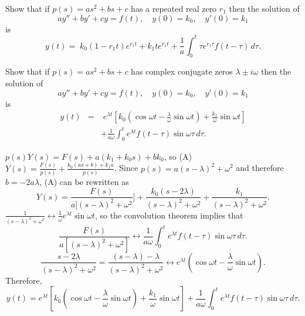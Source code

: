 \documentclass{ximera}
\begin{document}
\begin{problem}\label{exer:8.6.9}
Show that if $p(s)=as^2+bs+c$ has
a repeated  real zero $r_1$ then
 the solution of
$$
ay''+by'+cy=f(t),\quad y(0)=k_0,\quad y'(0)=k_1
$$
is
$$
y(t)=\; k_0(1-r_1t)e^{r_1t}+k_1te^{r_1t}
+\frac{1}{a}\int_0^t\tau
e^{r_1\tau}f(t-\tau)\,d\tau.
$$
\end{problem}

\begin{problem}\label{exer:8.6.10}
 Show that if $p(s)=as^2+bs+c$ has
 complex conjugate zeros $\lambda\pm i\omega$
then the solution of
$$
ay''+by'+cy=f(t),\quad y(0)=k_0,\quad y'(0)=k_1
$$
is
\begin{eqnarray*}
y(t)&=&\;  e^{\lambda t}\left[k_0(\cos\omega t-\frac{\lambda}{\omega}\sin\omega
t)+\frac{k_1}{\omega}\sin\omega t\right]
\\
&&+\frac{1}{a\omega}\int_0^te^{\lambda t}f(t-\tau)\sin\omega\tau\,
d\tau.
\end{eqnarray*}

\begin{solution}
$p(s)Y(s)=F(s)+a(k_1+k_0s)+bk_0$, so
(A) $Y(s)=\frac{F(s)}{p(s)}+\frac{k_0(as+b)+k_1a}{p(s)}$.
Since $p(s)=a(s-\lambda)^2+\omega^2$ and therefore $b=-2a\lambda$,
(A) can be rewritten as
$$
Y(s)=\frac{F(s)}{a[(s-\lambda)^2+\omega^2}]+\frac{k_0(s-2\lambda)}{(s-\lambda)^2+\omega^2}
+\frac{k_1}{(s-\lambda)^2+\omega^2}.
$$
$\frac{1}{(s-\lambda)^2+\omega^2}\leftrightarrow
\frac{1}{\omega}e^{\lambda t}\sin\omega t$, so the convolution theorem
implies that
$$
\frac{F(s)}{a[(s-\lambda)^2+\omega^2]}\leftrightarrow
\frac{1}{a\omega}\int_0^te^{\lambda t}f(t-\tau)\sin\omega\tau\,
d\tau.
$$
$$
\frac{s-2\lambda}{(s-\lambda)^2+\omega^2}=
\frac{(s-\lambda)-\lambda}{(s-\lambda)^2+\omega^2}\leftrightarrow
e^{\lambda t}\left(\cos\omega
t-\frac{\lambda}{\omega}\sin\omega t\right).
$$
Therefore,
$$
y(t)=e^{\lambda t}\left[k_0\left(\cos\omega
t-\frac{\lambda}{\omega}\sin\omega
t\right)+\frac{k_1}{\omega}\sin\omega t\right]
+\frac{1}{a\omega}\int_0^te^{\lambda t}f(t-\tau)\sin\omega\tau\,
d\tau.
$$
\end{solution}
\end{problem}
\end{document}
